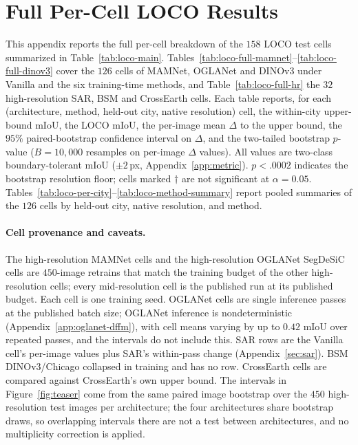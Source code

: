 \section{Full Per-Cell LOCO Results}
\label{app:loco-full}
\label{app:loco_extended} %

This appendix reports the full per-cell breakdown of the $158$ LOCO test
cells summarized in Table~\ref{tab:loco-main}. Tables~\ref{tab:loco-full-mamnet}--\ref{tab:loco-full-dinov3}
cover the $126$ cells of MAMNet, OGLANet and DINOv3 under Vanilla and the six training-time methods, and
Table~\ref{tab:loco-full-hr} the $32$ high-resolution SAR, BSM and CrossEarth cells.  Each table reports, for each (architecture, method, held-out city, native resolution)
cell, the within-city upper-bound mIoU, the LOCO mIoU, the per-image mean
$\Delta$ to the upper bound, the $95\%$ paired-bootstrap confidence interval
on $\Delta$, and the two-tailed bootstrap $p$-value
($B = 10{,}000$ resamples on per-image $\Delta$ values). All values are
two-class boundary-tolerant mIoU ($\pm 2$\,px, Appendix~\ref{app:metric}).
$p < .0002$ indicates the bootstrap resolution floor; cells marked $\dagger$
are not significant at $\alpha = 0.05$.
Tables~\ref{tab:loco-per-city}--\ref{tab:loco-method-summary} report pooled
summaries of the $126$ cells by held-out city, native resolution, and method.

\paragraph{Cell provenance and caveats.} The high-resolution MAMNet cells and
the high-resolution OGLANet SegDeSiC cells are $450$-image retrains that match
the training budget of the other high-resolution cells; every mid-resolution
cell is the published run at its published budget.  Each cell is one training
seed.  OGLANet cells are single inference passes at the published batch size;
OGLANet inference is nondeterministic (Appendix~\ref{app:oglanet-dffm}), with
cell means varying by up to $0.42$ mIoU over repeated passes, and the intervals do not include this.  SAR
rows are the Vanilla cell's per-image values plus SAR's within-pass change
(Appendix~\ref{sec:sar}).  BSM DINOv3/Chicago collapsed in training and has no
row.  CrossEarth cells are compared against CrossEarth's own upper bound.  The
intervals in Figure~\ref{fig:teaser} come from the same paired image bootstrap
over the $450$ high-resolution test images per architecture; the four
architectures share bootstrap draws, so overlapping intervals there are not a
test between architectures, and no multiplicity correction is applied.

